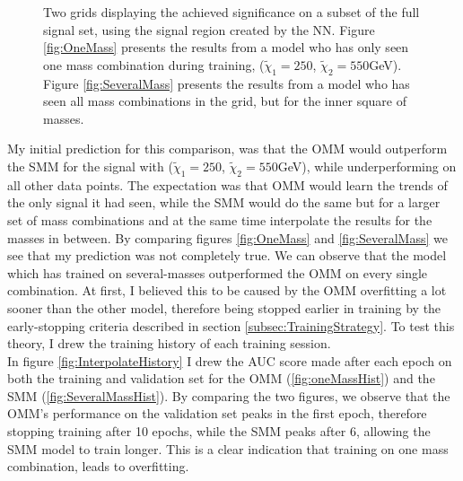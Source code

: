 \begin{figure}
{\begin{subfigure}{.6\textwidth}
    \end{subfigure}
    }
    \caption[Two grids displaying the achieved significance on a subset of the full signal set, using the signal region 
    created by two dense \ac{NN}'s, each training on different amounts of signal.]{Two grids displaying the achieved significance 
    on a subset of the full signal set, using the signal region created by the \ac{NN}. Figure \ref{fig:OneMass} presents the results 
    from a model who has only seen one mass combination during training, ($\tilde{\chi}_1=250$, $\tilde{\chi}_2=550$GeV). Figure 
    \ref{fig:SeveralMass} presents the results from a model who has seen all mass combinations in the grid, but for the inner square of masses. }
    \label{fig:Interpolation}
\end{figure}
My initial prediction for this comparison, was that the \ac{OMM} would outperform the \ac{SMM} for the signal with
($\tilde{\chi}_1=250$, $\tilde{\chi}_2=550$GeV), while underperforming on all other data points. The expectation was that \ac{OMM} 
would learn the trends of the only signal it had seen, while the \ac{SMM} would do the same but for a larger set of mass combinations and 
at the same time interpolate the results for the masses in between. By comparing figures \ref{fig:OneMass} and \ref{fig:SeveralMass} we 
see that my prediction was not completely true. We can observe that the model which has trained on several-masses outperformed the 
\ac{OMM} on every single combination. At first, I believed this to be caused by the \ac{OMM} overfitting a lot sooner than the other 
model, therefore being stopped earlier in training by the early-stopping criteria described in section \ref{subsec:TrainingStrategy}. 
To test this theory, I drew the training history of each training session.
\\
In figure \ref{fig:InterpolateHistory} I drew the \ac{AUC} score made after each epoch on both the training and validation set
for the \ac{OMM} (\ref{fig:oneMassHist}) and the \ac{SMM} (\ref{fig:SeveralMassHist}). By comparing the two figures,
we observe that the \ac{OMM}'s performance on the validation set peaks in the first epoch, therefore stopping training after 
10 epochs, while the \ac{SMM} peaks after 6, allowing the \ac{SMM} model to train longer. This is a clear indication that training on one mass combination, leads 
to overfitting. 
